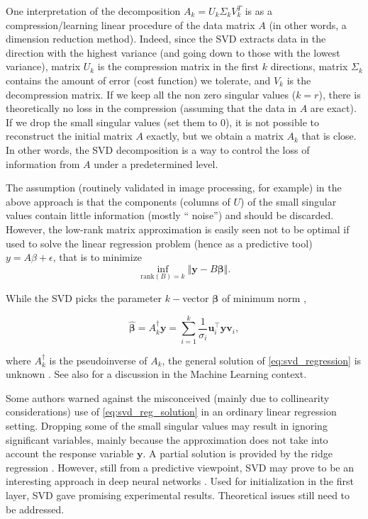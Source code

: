 \documentclass{article}
\def\y{\mathbf y}
\def\u{\mathbf u}
\def\v{\mathbf v}
\def\bbeta{\boldsymbol \beta}
\begin{document}
One interpretation of the decomposition $A_{k}=U_{k}\Sigma_{k}V_{k}^{T}$ is as
a compression/learning linear procedure of the data matrix $A$ (in other
words, a dimension reduction method). Indeed, since the SVD extracts data in
the direction with the highest variance (and going down to those with the
lowest variance), matrix $U_{k}$ is the compression matrix in the first $k$
directions, matrix $\Sigma_{k}$ contains the amount of error (cost function)
we tolerate, and $V_{k}$ is the decompression matrix. If we keep all the non
zero singular values ($k=r$), there is theoretically no loss in the
compression (assuming that the data in $A$ are exact). If we drop the small
singular values (set them to $0$), it is not possible to reconstruct the
initial matrix $A$ exactly, but we obtain a matrix $A_{k}$ that is close. In
other words, the SVD decomposition is a way to control the loss of information
from $A$ under a predetermined level.

The assumption (routinely validated in image processing, for example) in the
above approach is that the components (columns of $U$) of the small singular
values contain little information (mostly \textquotedblleft
noise\textquotedblright) and should be discarded. However, the low-rank matrix approximation is easily seen not to be optimal if used to solve the linear regression problem (hence as a predictive tool) $y=A\beta+\epsilon$, that is to minimize
\begin{equation}
    \inf_{\mathrm{rank}(B)=k}\left\Vert \y-B\bbeta\right\Vert . 
    \label{eq:svd_regression}
\end{equation}

While the SVD picks the parameter $k-$vector $\bbeta$ of minimum norm
\citep{elden2007matrix,lange2010numerical},

\begin{equation}
    \hat{\bbeta}=A_{k}^{\dag} \y=\sum_{i=1}^{k}\frac{1}{\sigma_{i}} \u_{i}^\top \y \v_{i},
    \label{eq:svd_reg_solution}
\end{equation}

where $A_{k}^{\dag}$ is the pseudoinverse of $A_{k}$, the general solution of
\eqref{eq:svd_regression} is unknown \citep{xiang2012optimal}. See also \cite{talwalkar2010matrix} for a discussion in the Machine Learning context.

Some authors \citep{jolliffe1982note,hadi1998some} warned against the misconceived (mainly due to collinearity considerations) use of \eqref{eq:svd_reg_solution} in an ordinary linear regression setting. Dropping some of the small singular values may result in ignoring significant variables, mainly because the approximation does not take into account the response variable $\y$. A partial solution is provided by the ridge regression \citep{hoerl1970ridge}. However, still from a predictive viewpoint, SVD may prove to be an interesting approach in deep neural networks \citep{bermeitinger2019singular}. Used for initialization in the first layer, SVD gave promising experimental results. Theoretical issues still need to be addressed.
\end{document}
